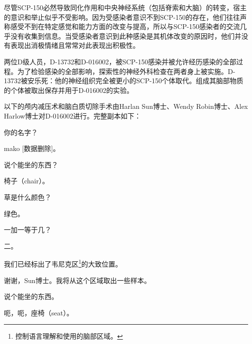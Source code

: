 尽管SCP-150必然导致同化作用和中央神经系统（包括脊索和大脑）的转变，宿主的意识和举止似乎不受影响。因为受感染者意识不到SCP-150的存在，他们往往声称感受不到在特定感觉和能力方面的改变与提高，所以与SCP-150感染者的交流几乎没有收集到信息。当受感染者意识到此种感染是其机体改变的原因时，他们并没有表现出消极情绪且常常对此表现出积极性。

两位D级人员，D-13732和D-016002，被SCP-150感染并被允许经历感染的全部过程。为了检验感染的全部影响，探索性的神经外科检查在两者身上被实施。D-13732被安乐死：他的神经组织完全被更小的SCP-150个体取代。组成其脑部物质的个体被取出保存并用于D-016002的实验。

以下的颅内减压术和脑白质切除手术由Harlan Sun博士、Wendy Robin博士、Alex Harlow博士对D-016002进行。完整副本如下：

\begin{scpbox}



你的名字？

mako {[}数据删除]。

说个能坐的东西？

椅子（chair）。

草是什么颜色？

绿色。

一加一等于几？

二。

我们已经标出了韦尼克区\footnote{控制语言理解和使用的脑部区域。}的大致位置。

谢谢，Sun博士。我将从这个区域取出一些样本。


说个能坐的东西。

呃，呃，座椅（seat）。


\end{scpbox}
